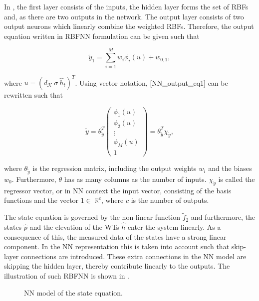  \vspace{-3mm}

 In , the first layer consists of the inputs, the hidden layer forms the set of RBFs and, as there are two outputs in the network. The output layer consists of two output neurons which linearly combine the weighted RBFs. Therefore, the output equation written in RBFNN formulation can be given such that 

  \begin{equation}
\label{NN_output_eq1}
\tilde{y}_1 = \sum_{i = 1}^M w_i \phi_i(u) +  w_{0,1},
\end{equation}

where $u = (\bar{d}_{\mathcal{K}} \ \sigma \ \hat{h}_t )^T$. Using vector notation, \eqref{NN_output_eq1} can be rewritten such that

  \begin{equation}
\label{NN_output_vector1}
\tilde{y} = \theta^T_{\tilde{y}} 
          \begin{pmatrix}
           \phi_1(u) \\[1pt]
           \phi_2(u) \\[1pt]
           \vdots \\[1pt]
           \phi_M(u)\\[3pt]
           1 
         \end{pmatrix}
         =
         \theta^T_{\tilde{y}} \chi_{\tilde{y}},
\end{equation}

where $\theta_{\tilde{y}}$ is the regression matrix, including the output weights $w_i$ and the biases $w_0$. Furthermore, $\theta$ has as many columns as the number of inputs. $\chi_{\tilde{y}}$ is called the regressor vector, or in NN context the input vector, consisting of the basis functions and the vector $1 \in \: \mathbb{R}^{c} $, where $c$ is the number of outputs. 

The state equation is governed by the non-linear function $\tilde{f}_2$ and furthermore, the states $\hat{p}$ and the elevation of the WTs $\hat{h}$ enter the system linearly. As a consequence of this, the measured data of the states have a strong linear component. In the NN representation this is taken into account such that skip-layer connections are introduced. These extra connections in the NN model are skipping the hidden layer, thereby contribute linearly to the outputs. The illustration of such RBFNN is shown in .

 \begin{figure}[H]
 \centering
  
 \caption{NN model of the state equation.}
 \label{fig:nn_state}
 \end{figure}

